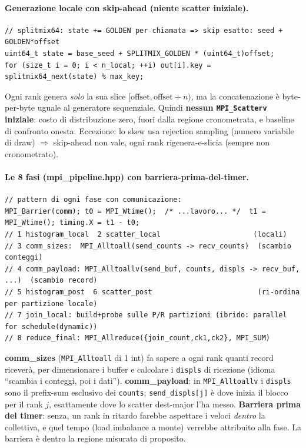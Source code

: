 \documentclass[11pt,a4paper]{article}
\begin{document}
\paragraph{Generazione locale con skip-ahead (niente scatter iniziale).}
\begin{lstlisting}[style=cpp]
// splitmix64: state += GOLDEN per chiamata => skip esatto: seed + GOLDEN*offset
uint64_t state = base_seed + SPLITMIX_GOLDEN * (uint64_t)offset;
for (size_t i = 0; i < n_local; ++i) out[i].key = splitmix64_next(state) % max_key;
\end{lstlisting}
\begin{whybox}
Ogni rank genera \emph{solo} la sua slice $[\text{offset}, \text{offset}+n)$, ma la concatenazione è byte-per-byte uguale al generatore sequenziale. Quindi \textbf{nessun \texttt{MPI\_Scatterv} iniziale}: costo di distribuzione zero, fuori dalla regione cronometrata, e baseline di confronto onesta. Eccezione: lo skew usa rejection sampling (numero variabile di draw) $\Rightarrow$ skip-ahead non vale, ogni rank rigenera-e-slicia (sempre non cronometrato).
\end{whybox}

\paragraph{Le 8 fasi (mpi\_pipeline.hpp) con barriera-prima-del-timer.}
\begin{lstlisting}[style=cpp]
// pattern di ogni fase con comunicazione:
MPI_Barrier(comm); t0 = MPI_Wtime();  /* ...lavoro... */  t1 = MPI_Wtime(); timing.X = t1 - t0;
// 1 histogram_local  2 scatter_local                      (locali)
// 3 comm_sizes:  MPI_Alltoall(send_counts -> recv_counts)  (scambio conteggi)
// 4 comm_payload: MPI_Alltoallv(send_buf, counts, displs -> recv_buf, ...)  (scambio record)
// 5 histogram_post  6 scatter_post                         (ri-ordina per partizione locale)
// 7 join_local: build+probe sulle P/R partizioni (ibrido: parallel for schedule(dynamic))
// 8 reduce_final: MPI_Allreduce({join_count,ck1,ck2}, MPI_SUM)
\end{lstlisting}
\begin{whybox}
\textbf{comm\_sizes} (\texttt{MPI\_Alltoall} di 1 int) fa sapere a ogni rank quanti record riceverà, per dimensionare i buffer e calcolare i \texttt{displs} di ricezione (idioma ``scambia i conteggi, poi i dati''). \textbf{comm\_payload}: in \texttt{MPI\_Alltoallv} i \texttt{displs} sono il prefix-sum esclusivo dei \texttt{counts}; \texttt{send\_displs[j]} è dove inizia il blocco per il rank $j$, esattamente dove lo scatter dest-major l'ha messo. \textbf{Barriera prima del timer}: senza, un rank in ritardo farebbe aspettare i veloci \emph{dentro} la collettiva, e quel tempo (load imbalance a monte) verrebbe attribuito alla fase. La barriera è dentro la regione misurata di proposito.
\end{whybox}
\end{document}
